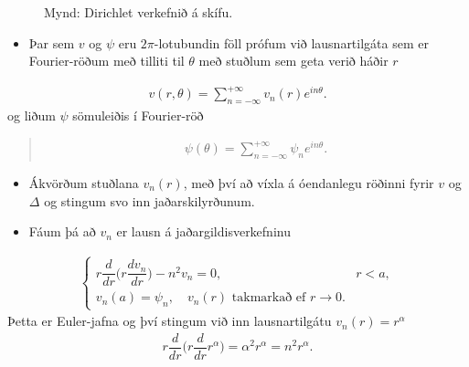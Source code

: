 \documentclass[a4paper,10pt,icelandic]{sphinxmanual}
\begin{document}
\begin{figure}[htbp]
\centering
\capstart

\noindent{}
\caption{Mynd: Dirichlet verkefnið á skífu.}\label{\detokenize{Kafli03:id12}}\end{figure}
\begin{itemize}
\item {} 
Þar sem \(v\) og \({\psi}\) eru \(2\pi\)-lotubundin föll prófum við lausnartilgáta sem er Fourier-röðum með tilliti til \({\theta}\) með stuðlum sem geta verið háðir \(r\)

\end{itemize}
\begin{equation*}
\begin{split}v(r,\theta)=\sum\limits_{n=-\infty}^{+\infty}
 v_n(r)e^{in\theta}.\end{split}
\end{equation*}
og liðum \(\psi\) sömuleiðis í Fourier-röð
\begin{quote}
\begin{equation*}
\begin{split}{\psi}(\theta)=\sum\limits_{n=-\infty}^{+\infty}
{\psi}_n e^{in\theta}.\end{split}
\end{equation*}\end{quote}
\begin{itemize}
\item {} 
Ákvörðum stuðlana \(v_{n}(r)\), með því að víxla á óendanlegu röðinni fyrir \(v\) og \(\Delta\) og stingum svo inn jaðarskilyrðunum.

\item {} 
Fáum þá að \(v_{n}\) er lausn á jaðargildisverkefninu

\end{itemize}
\begin{equation*}
\begin{split}\begin{cases}
 r\dfrac d{dr}\bigg(r\dfrac{dv_n}{dr}\bigg)-n^2v_n=0, &r<a,\\
 v_n(a)={\psi}_n, \quad v_n(r) \text{ takmarkað ef } r\to 0.
 \end{cases}\end{split}
\end{equation*}
Þetta er Euler-jafna og því stingum við inn lausnartilgátu \(v_n(r)=r^\alpha\)
\begin{equation*}
\begin{split}r\dfrac d{dr}\bigg( r\dfrac d{dr}r^\alpha\bigg)=\alpha^2r^\alpha=
 n^2r^\alpha.\end{split}
\end{equation*}
\end{document}
